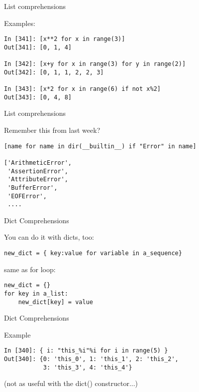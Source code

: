 \documentclass{beamer}
\begin{document}
\begin{frame}[fragile]{List comprehensions}

{\Large Examples:}

\begin{verbatim}
In [341]: [x**2 for x in range(3)]
Out[341]: [0, 1, 4]

In [342]: [x+y for x in range(3) for y in range(2)]
Out[342]: [0, 1, 1, 2, 2, 3]

In [343]: [x*2 for x in range(6) if not x%2]
Out[343]: [0, 4, 8]
\end{verbatim}

\end{frame} 

\begin{frame}[fragile]{List comprehensions}

{\Large Remember this from last week?}

\begin{verbatim}
[name for name in dir(__builtin__) if "Error" in name]

['ArithmeticError',
 'AssertionError',
 'AttributeError',
 'BufferError',
 'EOFError',
 ....
\end{verbatim}

\end{frame} 

\begin{frame}[fragile]{Dict Comprehensions}

{\Large You can do it with dicts, too:}

\begin{verbatim}
new_dict = { key:value for variable in a_sequence}
\end{verbatim}

{\Large same as for loop:}

\begin{verbatim}
new_dict = {}
for key in a_list:
    new_dict[key] = value
\end{verbatim}

\end{frame} 

\begin{frame}[fragile]{Dict Comprehensions}

{\Large Example}

\begin{verbatim}
In [340]: { i: "this_%i"%i for i in range(5) }
Out[340]: {0: 'this_0', 1: 'this_1', 2: 'this_2',
           3: 'this_3', 4: 'this_4'}
\end{verbatim}

\vfill
(not as useful with the dict() constructor...)
\end{frame} 
\end{document}
